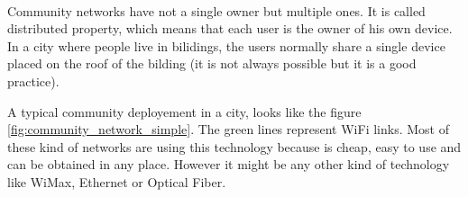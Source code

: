 \documentclass[conference]{IEEEtran}
\begin{document}
\begin{figure}[!t]
 \centering
 \\
\end{figure}



Community networks have not a single owner but multiple ones. It is called distributed property, 
which means that each user is the owner of his own device. In a city where people live in 
bilidings, the users normally share a single device placed on the roof of the bilding (it is not always
possible but it is a good practice).

A typical community deployement in a city, looks like the figure \ref{fig:community_network_simple}.
The green lines represent WiFi links. Most of these kind of networks are using this technology because 
is cheap, easy to use and can be obtained in any place. However it might be any other kind of technology 
like WiMax, Ethernet or Optical Fiber.

\end{document}
